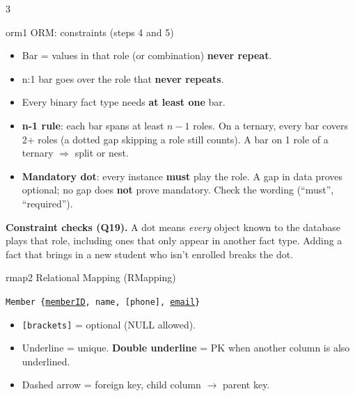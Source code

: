 \documentclass[9pt]{extarticle}
\newcommand{\sub}[2][ink]{\par\smallskip{\color{#1}\bfseries #2}\par\nobreak\vspace{1pt}}
\newcommand{\code}[1]{\texttt{\small #1}}
\newcommand{\pred}[2]{%
  \node[role, anchor=west] (#2a) at (#1) {};
  \node[role, anchor=west] (#2b) at (#2a.east) {};}
\begin{document}
\begin{multicols*}{3}
\begin{topic}{orm}{1 \quad ORM: constraints (steps 4 and 5)}
\begin{center}
\end{center}
\begin{itemize}
  \item Bar = values in that role (or combination) \textbf{never repeat}.
  \item n:1 bar goes over the role that \textbf{never repeats}.
  \item Every binary fact type needs \textbf{at least one} bar.
  \item \textbf{n-1 rule}: each bar spans at least $n-1$ roles. On a ternary, every bar covers 2+ roles (a dotted gap skipping a role still counts). A bar on 1 role of a ternary $\Rightarrow$ split or nest.
  \item \textbf{Mandatory dot}: every instance \textbf{must} play the role. A gap in data proves optional; no gap does \textbf{not} prove mandatory. Check the wording (``must'', ``required'').
\end{itemize}
\begin{trap}
\textbf{Constraint checks (Q19).} A dot means \emph{every} object known to the database plays that role, including ones that only appear in another fact type. Adding a fact that brings in a new student who isn't enrolled breaks the dot.
\end{trap}
\end{topic}

\begin{topic}{rmap}{2 \quad Relational Mapping (RMapping)}
\sub[rmap]{RMap syntax}
\code{Member \{\underline{\underline{memberID}}, name, [phone], \underline{email}\}}
\begin{itemize}
  \item \code{[brackets]} = optional (NULL allowed).
  \item Underline = unique. \textbf{Double underline} = PK when another column is also underlined.
  \item Dashed arrow = foreign key, child column $\to$ parent key.
\end{itemize}


\end{topic}
\end{multicols*}
\end{document}
